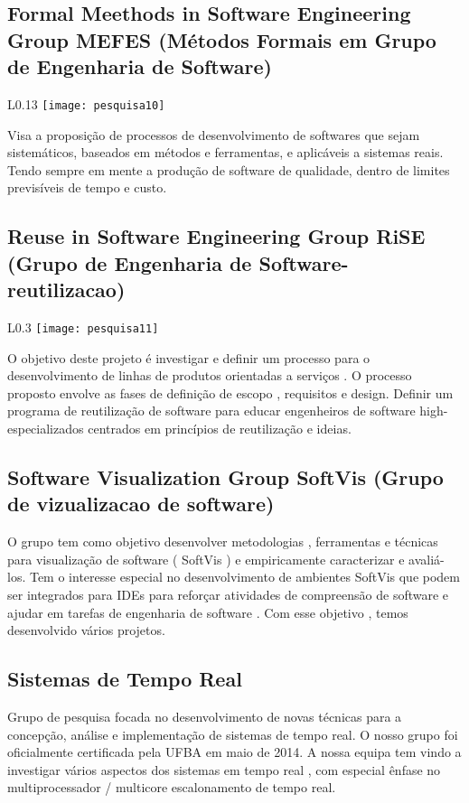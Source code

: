       \subsection{Formal Meethods in Software Engineering Group  MEFES
      (Métodos Formais em Grupo de Engenharia de Software)}
       \begin{wrapfigure}{L}{0.13\textwidth}
            \centering
            \texttt{[image: pesquisa10]}
        \end{wrapfigure} 
      Visa a proposição de processos de desenvolvimento de softwares que sejam sistemáticos, baseados em métodos e ferramentas, e aplicáveis a sistemas reais. Tendo sempre em mente a produção de software de qualidade, dentro de limites previsíveis de tempo e custo.
    
      \subsection{Reuse in Software Engineering Group RiSE
      (Grupo de Engenharia de Software-reutilizacao)}
       \begin{wrapfigure}{L}{0.3\textwidth}
            \centering
            \texttt{[image: pesquisa11]}
        \end{wrapfigure} 
      O objetivo deste projeto é investigar e definir um processo para o desenvolvimento de linhas de produtos orientadas a serviços . O processo proposto envolve as fases de definição de escopo , requisitos e design. Definir um programa de reutilização de software para educar engenheiros de software high- especializados centrados em princípios de reutilização e ideias.
    
     \subsection{Software Visualization Group SoftVis
      (Grupo de vizualizacao de software)}
      O grupo tem como objetivo desenvolver metodologias , ferramentas e técnicas para visualização de software ( SoftVis ) e empiricamente caracterizar e avaliá-los. Tem o interesse especial no desenvolvimento de ambientes SoftVis que podem ser integrados para IDEs para reforçar atividades de compreensão de software e ajudar em tarefas de engenharia de software . Com esse objetivo , temos desenvolvido vários projetos.
     
     \subsection{Sistemas de Tempo Real}
      Grupo de pesquisa focada no desenvolvimento de novas técnicas para a concepção, análise e implementação de sistemas de tempo real. O nosso grupo foi oficialmente certificada pela UFBA em maio de 2014. A nossa equipa tem vindo a investigar vários aspectos dos sistemas em tempo real , com especial ênfase no multiprocessador / multicore escalonamento de tempo real.
     

